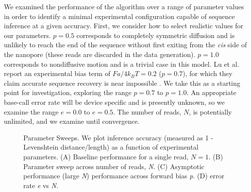 \documentclass{biophys_letter}
\begin{document}
We examined the performance of the algorithm over a range of parameter values in order to identify a minimal experimental configuration capable of sequence inference at a given accuracy.
First, we consider how to select realistic values for our parameters.
$p=0.5$ corresponds to completely symmetric diffusion and is unlikely to reach the end of the sequence without first exiting from the {\it cis} side of the nanopore (these reads are discarded in the data generation).
$p=1.0$ corresponds to nondiffusive motion and is a trivial case in this model.
Lu et al. report an experimental bias term of $Fa/4k_{B}T=0.2$ ($p=0.7$), for which they claim accurate sequence recovery is near impossible \cite{Lu:2011}.
We take this as a starting point for investigation, exploring the range $p=0.7$ to $p=1.0$.
An appropriate base-call error rate will be device specific and is presently unknown, so we examine the range $e=0.0$ to $e=0.5$.
The number of reads, $N$, is potentially unlimited, and we examine until convergence.

\begin{figure}
  \caption{Parameter Sweeps. We plot inference accuracy (measured as 1 - Levenshtein distance/length) as a function of experimental parameters. (A) Baseline performance for a single read, $N=1$. (B) Parameter sweep across number of reads, \emph{N}. (C) Asymptotic performance (large \emph{N}) performance across forward bias \emph{p}. (D) error rate \emph{e} vs \emph{N}.}
\label{fig:parameter_sweeps}
\end{figure}
\end{document}
